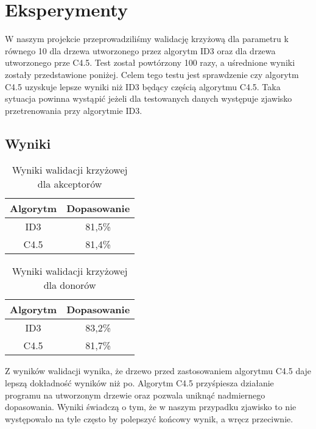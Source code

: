 \section{Eksperymenty}
W naszym projekcie przeprowadziliśmy walidację krzyżową dla parametru k równego 10 dla drzewa utworzonego przez algorytm ID3 oraz dla drzewa utworzonego prze C4.5. Test został powtórzony 100 razy, a uśrednione wyniki zostały przedstawione poniżej.
Celem tego testu jest sprawdzenie czy algorytm C4.5 uzyskuje lepsze wyniki niż ID3 będący częścią algorytmu C4.5. Taka sytuacja powinna wystąpić jeżeli dla testowanych danych występuje zjawisko przetrenowania przy algorytmie ID3.
\subsection{Wyniki}



\begin{table}[H]
    \centering
    \begin{tabular}{|c|c|}
    \hline
    Algorytm                & Dopasowanie         \\ \hline
    ID3                     & 81,5\%              \\ \hline
    C4.5                    & 81,4\%              \\ \hline
    \end{tabular}
    \caption{Wyniki walidacji krzyżowej dla akceptorów}
    \label{tab:crossing}
\end{table}

\begin{table}[H]
    \centering
    \begin{tabular}{|c|c|}
    \hline
    Algorytm                & Dopasowanie         \\ \hline
    ID3                     & 83,2\%              \\ \hline
    C4.5                    & 81,7\%              \\ \hline
    \end{tabular}
    \caption{Wyniki walidacji krzyżowej dla donorów}
    \label{tab:crossing}
\end{table}

Z wyników walidacji wynika, że drzewo przed zastosowaniem algorytmu C4.5 daje lepszą dokładność wyników niż po. Algorytm C4.5 przyśpiesza działanie programu na utworzonym drzewie oraz pozwala uniknąć nadmiernego dopasowania. Wyniki świadczą o tym, że w naszym przypadku zjawisko to nie występowało na tyle często by polepszyć końcowy wynik, a wręcz przeciwnie.

